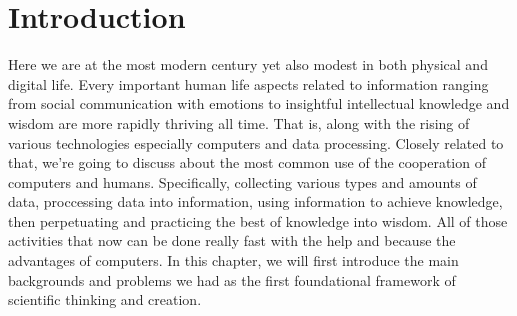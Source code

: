 \chapter{Introduction}
\label{chap:introduction}

Here we are at the most modern century yet also modest in both physical and digital life.
Every important human life aspects related to information ranging from social communication with emotions to insightful intellectual knowledge and wisdom are more rapidly thriving all time.
That is, along with the rising of various technologies especially computers and data processing.
Closely related to that, we're going to discuss about the most common use of the cooperation of computers and humans.
Specifically, collecting various types and amounts of data, proccessing data into information, using information to achieve knowledge, then perpetuating and practicing the best of knowledge into wisdom.
All of those activities that now can be done really fast with the help and because the advantages of computers.
In this chapter, we will first introduce the main backgrounds and problems we had as the first foundational framework of scientific thinking and creation.
